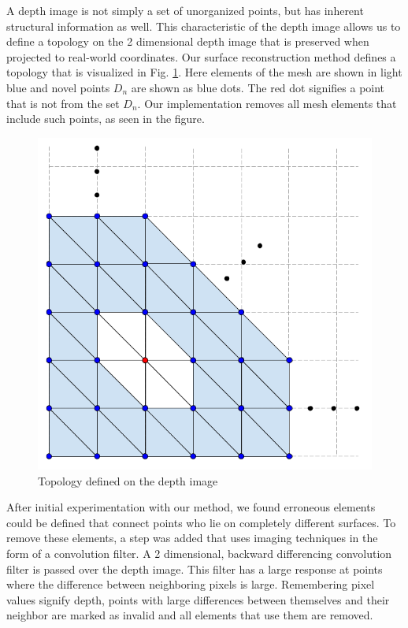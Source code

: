 A depth image is not simply a set of unorganized points, but has inherent
structural information as well. This characteristic of the depth image allows us
to define a topology on the 2 dimensional depth image that is preserved when
projected to real-world coordinates. Our surface reconstruction method defines a
topology that is visualized in Fig. \ref{fig:srm}. Here elements of the mesh
are shown in light blue and novel points $D_n$ are shown as blue dots. The red
dot signifies a point that is not from the set $D_n$. Our implementation removes
all mesh elements that include such points, as seen in the figure.

\begin{figure}[h]%
\centering
  \includegraphics[width=.6\textwidth]
    {figures/diagram_surface_reconstruction.png}
  \caption{Topology defined on the depth image}
  \label{fig:srm}
\end{figure}

After initial experimentation with our method, we found erroneous elements could
be defined that connect points who lie on completely different surfaces. To
remove these elements, a step was added that uses imaging techniques in the form
of a convolution filter. A 2 dimensional, backward differencing convolution
filter is passed over the depth image. This filter has a large response at
points where the difference between neighboring pixels is large. Remembering
pixel values signify depth, points with large differences between themselves and
their neighbor are marked as invalid and all elements that use them are removed.

